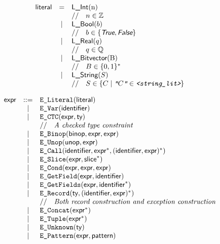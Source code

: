 \documentclass{book}
\begin{document}
\[\begin{array}{rcl}
\literal &=& \lint($n$) \\
 & & \ASTComment{$n \in \Z$}\\
 &|& \lbool(b) \\
 & & \ASTComment{$b \in \{\True, \False\}$}\\
 &|& \lreal(q)  \\
 & & \ASTComment{$q \in \Q$}\\
 &|& \lbitvector($B$)   \\
 & & \ASTComment{$B \in \{0, 1\}^*$}\\
 &|& \lstring(S)\\
 & & \ASTComment{$S \in \{C \;|\; \texttt{"$C$"} \in \texttt{<string\_lit>}\} $}\\
\end{array}
\]

\[
\begin{array}{rcl}
\textsf{expr} &::=& \texttt{E\_Literal}(\textsf{literal}) \\
	&|& \texttt{E\_Var}(\texttt{\textsf{identifier}}) \\
	&|& \texttt{E\_CTC}(\texttt{\textsf{expr}}, \textsf{ty}) \\
  & & //\quad\textit{A checked type constraint}\ \\
	&|& \texttt{E\_Binop}(\textsf{binop}, \textsf{expr}, \textsf{expr}) \\
	&|& \texttt{E\_Unop}(\textsf{unop}, \textsf{expr}) \\
	&|& \texttt{E\_Call}(\textsf{identifier}, \textsf{expr}^{*}, (\textsf{identifier}, \textsf{expr})^{*}) \\
	&|& \texttt{E\_Slice}(\textsf{expr}, \textsf{slice}^{*}) \\
	&|& \texttt{E\_Cond}(\textsf{expr}, \textsf{expr}, \textsf{expr}) \\
	&|& \texttt{E\_GetField}(\textsf{expr}, \textsf{identifier}) \\
	&|& \texttt{E\_GetFields}(\textsf{expr}, \textsf{identifier}^{*}) \\
	&|& \texttt{E\_Record}(\textsf{ty}, (\textsf{identifier}, \textsf{expr})^{*})\\
    & & //\quad\textit{Both record construction and exception construction}\ \\
	&|& \texttt{E\_Concat}(\textsf{expr}^{*}) \\
	&|& \texttt{E\_Tuple}(\textsf{expr}^{*}) \\
	&|& \texttt{E\_Unknown}(\textsf{ty}) \\
	&|& \texttt{E\_Pattern}(\textsf{expr}, \textsf{pattern})
\end{array}
\]
\end{document}
